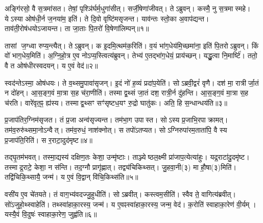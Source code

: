 \clearpage

\setcounter{anuvakam}{0}

अङ्गि॑रसो॒ वै स॒त्रमा॑सत।
तेषां॒ पृश्ञि॑र्घर्म॒धुगा॑सीत्।
सर्जी॒षेणा॑जीवत्।
तेऽब्रुवन्।
कस्मै॒ नु स॒त्रमास्महे।
येऽस्या ओष॑धी॒र्न ज॒नया॑म॒ इति॑।
ते दि॒वो वृष्टि॑मसृजन्त।
याव॑न्तः स्तो॒का अ॒वाप॑द्यन्त।
ताव॑ती॒रोष॑धयो\-ऽजायन्त।
ता जा॒ताः पि॒तरो॑ वि॒षेणा॑लिम्पन्॥१॥

तासां ज॒ग्ध्वा रुप्य॒न्त्यैत्।
तेऽब्रुवन्।
क इ॒दमि॒त्थम॑क॒रिति॑।
व॒यं भा॑ग॒धेय॑मि॒च्छमा॑ना॒ इति॑ पि॒तरो\-ऽब्रुवन्।
किं वो॑ भाग॒धेय॒मिति॑।
अ॒ग्नि॒हो॒त्र ए॒व नोऽप्य॒स्त्वित्य॑ब्रुवन्।
तेभ्य॑ ए॒तद्भा॑ग॒धेयं॒ प्राय॑च्छन्।
यद्धु॒त्वा नि॒मार्ष्टि॑।
ततो॒ वै त ओष॑धीरस्वदयन्।
य ए॒वं वेद॑॥२॥

स्वद॑न्ते\-ऽस्मा॒ ओष॑धयः।
ते व॒थ्समु॒पावा॑सृजन्।
इ॒दं नो॑ ह॒व्यं प्रदा॑प॒येति॑।
सोऽब्रवी॒द्वरं॑ वृणै।
दश॑ मा॒ रात्रीर्जा॒तं न दो॑हन्।
आ॒स॒ङ्ग॒वं मा॒त्रा स॒ह च॑रा॒णीति॑।
तस्माद्व॒थ्सं जा॒तं दश॒ रात्री॒र्न दु॑हन्ति।
आ॒स॒ङ्ग॒वं मा॒त्रा स॒ह च॑रति।
वारे॑वृत॒ꣴ॒ ह्य॑स्य।
तस्माद्व॒थ्सꣳ सꣳ॑सृष्टध॒यꣳ रु॒द्रो घातु॑कः।
अति॒ हि स॒न्धान्धय॑ति॥३॥\anuvakamend[अ॒लि॒म्प॒न्वेद॒ घातु॑क॒ एकं॑ च]

प्र॒जाप॑तिर॒ग्निम॑सृजत।
तं प्र॒जा अन्व॑सृज्यन्त।
तम॑भा॒ग उपास्त।
सोऽस्य प्र॒जाभि॒रपाक्रामत्।
तम॑व॒रुरु॑थ्समा॒नो\-ऽन्वैत्।
तम॑व॒रुधं॒ नाश॑क्नोत्।
स तपो॑\-ऽतप्यत।
सोऽग्निरुपा॑रम॒ताता॑पि॒ वै स्य प्र॒जाप॑ति॒रिति॑।
स र॒राटा॒दुद॑मृष्ट॥४॥

तद्\mbox{}घृ॒तम॑भवत्।
तस्मा॒द्यस्य॑ दक्षिण॒तः केशा॒ उन्मृ॑ष्टाः।
ताञ्ज्येष्ठल॒क्ष्मी प्रा॑जाप॒त्येत्या॑हुः।
यद्र॒राटा॑दु॒दमृ॑ष्ट।
तस्माद्र॒राटे॒ केशा॒ न स॑न्ति।
तद॒ग्नौ प्रागृ॑ह्णात्।
तद्व्य॑चिकिथ्सत्।
जु॒हवा॒नी(३) मा हौ॒षा(३)मिति॑।
तद्वि॑चिकि॒थ्सायै॒ जन्म॑।
य ए॒वं वि॒द्वान् वि॑चि॒किथ्स॑ति॥५॥

वसी॑य ए॒व चे॑तयते।
तं वाग॒भ्य॑वदज्जु॒हुधीति॑।
सोऽब्रवीत्।
कस्त्वम॒सीति॑।
स्वैव ते॒ वागित्य॑ब्रवीत्।
सो॑ऽजुहो॒थ्स्वाहेति॑।
तथ्स्वा॑हाका॒रस्य॒ जन्म॑।
य ए॒वꣴस्वा॑हाका॒रस्य॒ जन्म॒ वेद॑।
क॒रोति॑ स्वाहाका॒रेण॑ वी॒र्यम्।
यस्यै॒वं वि॒दुषः॑ स्वाहाका॒रेण॒ जुह्व॑ति॥६॥

